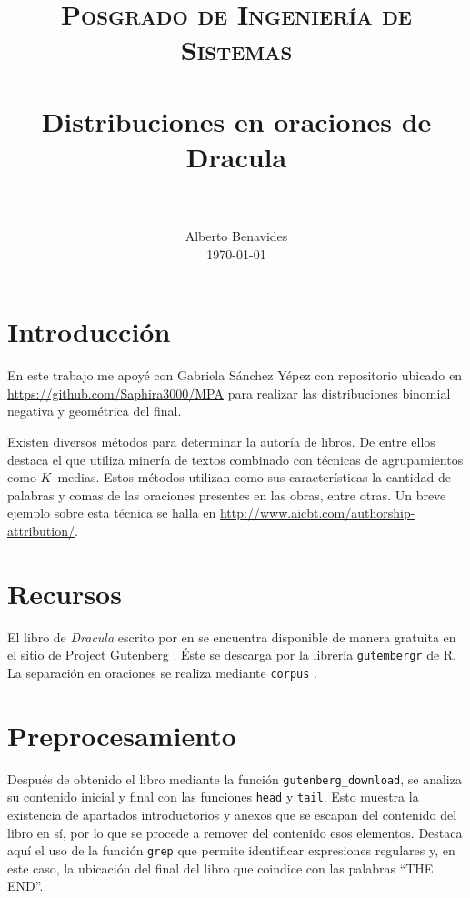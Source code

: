 \documentclass[paper=leter, fontsize=11pt]{scrartcl}
\title{
		\usefont{OT1}{bch}{b}{n}
		\normalfont \normalsize \textsc{Posgrado de Ingeniería de Sistemas} \\ [25pt]
		\horrule{0.5pt} \\[0.4cm]
		\huge Distribuciones en oraciones de Dracula \\
		\horrule{2pt} \\[0.5cm]
}
\author{
		\normalfont 								\normalsize
        Alberto Benavides\\[-3pt]		\normalsize
        \today
}
\date{}
\numberwithin{equation}{section}		%
\numberwithin{figure}{section}			%
\numberwithin{table}{section}				%
\begin{document}
\maketitle

\section{Introducción}

En este trabajo me apoyé con Gabriela Sánchez Yépez con repositorio ubicado en \url{https://github.com/Saphira3000/MPA} para realizar las distribuciones binomial negativa y geométrica del final.

Existen diversos métodos para determinar la autoría de libros. De entre ellos destaca el que utiliza minería de textos combinado con técnicas de agrupamientos como $K$--medias. Estos métodos utilizan como sus características la cantidad de palabras y comas de las oraciones presentes en las obras, entre otras. Un breve ejemplo sobre esta técnica se halla en \url{http://www.aicbt.com/authorship-attribution/}.

\section{Recursos}

El libro de \textit{Dracula} \cite{dracula1897} escrito por \citeauthor*{dracula1897} en \citeyear{dracula1897} se encuentra disponible de manera gratuita en el sitio de Project Gutenberg \cite{dracula}. Éste se descarga por la librería \texttt{gutembergr} \cite{gutenbergr} de R. La separación en oraciones se realiza mediante \texttt{corpus} \cite{corpus}.

\section{Preprocesamiento}
Después de obtenido el libro mediante la función \texttt{gutenberg\_download}, se analiza su contenido inicial y final con las funciones \texttt{head} y \texttt{tail}. Esto muestra la existencia de apartados introductorios y anexos que se escapan del contenido del libro en sí, por lo que se procede a remover del contenido esos elementos. Destaca aquí el uso de la función \texttt{grep} que permite identificar expresiones regulares y, en este caso, la ubicación del final del libro que coindice con las palabras ``THE END''.
\end{document}
